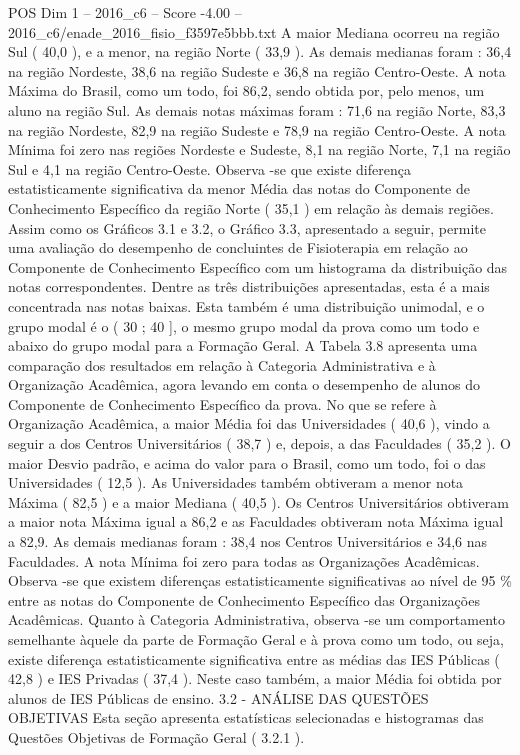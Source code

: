 \begin{textsample}{POS Dim 1 – 2016\_c6 – Score -4.00 – 2016\_c6/enade\_2016\_fisio\_f3597e5bbb.txt}
A maior Mediana ocorreu na região Sul ( 40,0 ), e a menor, na região Norte ( 33,9 ).
As demais medianas foram : 36,4 na região Nordeste, 38,6 na região Sudeste e 36,8 na região Centro-Oeste.
A nota Máxima do Brasil, como um todo, foi 86,2, sendo obtida por, pelo menos, um aluno na região Sul.
As demais notas máximas foram : 71,6 na região Norte, 83,3 na região Nordeste, 82,9 na região Sudeste e 78,9 na região Centro-Oeste.
A nota Mínima foi zero nas regiões Nordeste e Sudeste, 8,1 na região Norte, 7,1 na região Sul e 4,1 na região Centro-Oeste.
Observa -se que existe diferença estatisticamente significativa da menor Média das notas do Componente de Conhecimento Específico da região Norte ( 35,1 ) em relação às demais regiões.
Assim como os Gráficos 3.1 e 3.2, o Gráfico 3.3, apresentado a seguir, permite uma avaliação do desempenho de concluintes de Fisioterapia em relação ao Componente de Conhecimento Específico com um histograma da distribuição das notas correspondentes.
Dentre as três distribuições apresentadas, esta é a mais concentrada nas notas baixas.
Esta também é uma distribuição unimodal, e o grupo modal é o ( 30 ; 40 ], o mesmo grupo modal da prova como um todo e abaixo do grupo modal para a Formação Geral.
A Tabela 3.8 apresenta uma comparação dos resultados em relação à Categoria Administrativa e à Organização Acadêmica, agora levando em conta o desempenho de alunos do Componente de Conhecimento Específico da prova.
No que se refere à Organização Acadêmica, a maior Média foi das Universidades ( 40,6 ), vindo a seguir a dos Centros Universitários ( 38,7 ) e, depois, a das Faculdades ( 35,2 ).
O maior Desvio padrão, e acima do valor para o Brasil, como um todo, foi o das Universidades ( 12,5 ).
As Universidades também obtiveram a menor nota Máxima ( 82,5 ) e a maior Mediana ( 40,5 ).
Os Centros Universitários obtiveram a maior nota Máxima igual a 86,2 e as Faculdades obtiveram nota Máxima igual a 82,9.
As demais medianas foram : 38,4 nos Centros Universitários e 34,6 nas Faculdades.
A nota Mínima foi zero para todas as Organizações Acadêmicas.
Observa -se que existem diferenças estatisticamente significativas ao nível de 95 \% entre as notas do Componente de Conhecimento Específico das Organizações Acadêmicas.
Quanto à Categoria Administrativa, observa -se um comportamento semelhante àquele da parte de Formação Geral e à prova como um todo, ou seja, existe diferença estatisticamente significativa entre as médias das IES Públicas ( 42,8 ) e IES Privadas ( 37,4 ).
Neste caso também, a maior Média foi obtida por alunos de IES Públicas de ensino. 3.2 - ANÁLISE DAS QUESTÕES OBJETIVAS Esta seção apresenta estatísticas selecionadas e histogramas das Questões Objetivas de Formação Geral ( 3.2.1 ).

\end{textsample}
